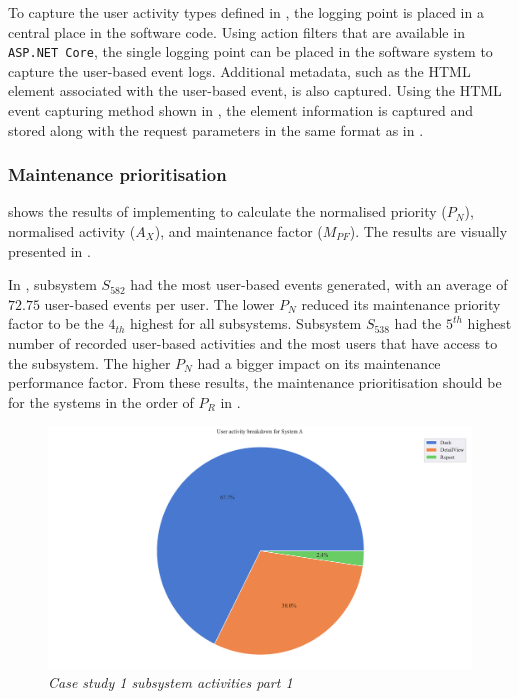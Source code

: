 To capture the user activity types defined in , the logging point is placed in a central place in the software code. Using action filters that are available in \texttt{ASP.NET Core}, the single logging point can be placed in the software system to capture the user-based event logs. Additional metadata, such as the HTML element associated with the user-based event, is also captured. Using the HTML event capturing method shown in , the element information is captured and stored along with the request parameters in the same format as in .

\subsubsection{Maintenance prioritisation}
 shows the results of implementing  to calculate the normalised priority ($P_N$), normalised activity ($A_X$), and maintenance factor ($M_{PF}$). The results are visually presented in .\par In , subsystem $S_{582}$ had the most user-based events generated, with an average of $72.75$ user-based events per user. The lower $P_N$ reduced its maintenance priority factor to be the $4_{th}$ highest for all subsystems. Subsystem $S_{538}$ had the $5^{th}$ highest number of recorded user-based activities and the most users that have access to the subsystem. The higher $P_N$ had a bigger impact on its maintenance performance factor. From these results, the maintenance prioritisation should be for the systems in the order of $P_R$ in .

\clearpage

\begin{figure}[!htb]
	\centering %
	\includegraphics[width=0.95\linewidth]{img/ch3/analysis/case_A_breakdown.pdf}
	\caption[Case study 1 subsystem activities part 1]
	{\textit{Case study 1 subsystem activities part 1}}\label{fig:ch3_caseABreakdown}
\end{figure} 

